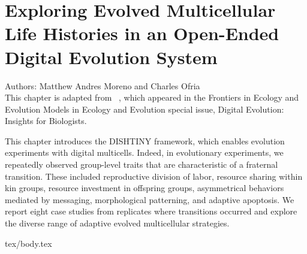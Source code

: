 \chapter{Exploring Evolved Multicellular Life Histories in an Open-Ended Digital Evolution System}
\label{ch:case-studies}

\noindent
Authors: Matthew Andres Moreno and Charles Ofria \\
This chapter is adapted from ~\citep{moreno2021exploring}, which appeared in the Frontiers in Ecology and Evolution Models in Ecology and Evolution special issue, Digital Evolution: Insights for Biologists.

This chapter introduces the DISHTINY framework, which enables evolution experiments with digital multicells.
Indeed, in evolutionary experiments, we repeatedly observed group-level traits that are characteristic of a fraternal transition.
These included reproductive division of labor, resource sharing within kin groups, resource investment in offspring groups, asymmetrical behaviors mediated by messaging, morphological patterning, and adaptive apoptosis.
We report eight case studies from replicates where transitions occurred and explore the diverse range of adaptive evolved multicellular strategies.

{tex/body.tex}
